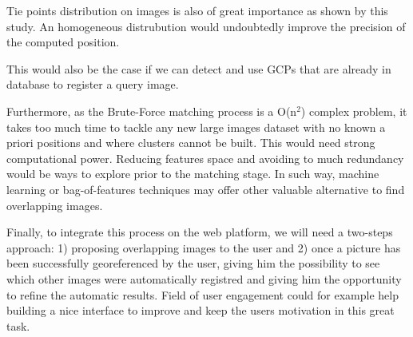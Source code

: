 \documentclass[fleqn,10pt]{wlpeerj} %
\begin{document}
Tie points distribution on images is also of great importance as shown by this
study. An homogeneous distrubution would undoubtedly improve the precision of the
computed position.

This would also be the case if we can detect and use GCPs that are already 
in database to register a query image. 

Furthermore, as the Brute-Force matching process is a O(n$^{2}$) complex problem, 
it takes too much time to tackle any new large images dataset with no known 
a priori positions and where clusters cannot be built. This would need strong
computational power.
Reducing features space and avoiding to much redundancy would be ways to explore 
prior to the matching stage.
In such way, machine learning or bag-of-features techniques may offer other 
valuable alternative to find overlapping images.


Finally, to integrate this process on the web platform, we will need a two-steps
approach: 1) proposing overlapping images to the user and 2) once a picture has 
been successfully georeferenced by the user, giving him the possibility to see
which other images were automatically registred and giving him the opportunity
to refine the automatic results. Field of user engagement could for example 
help building a nice interface to improve and keep the users motivation in this 
great task.








\end{document}
